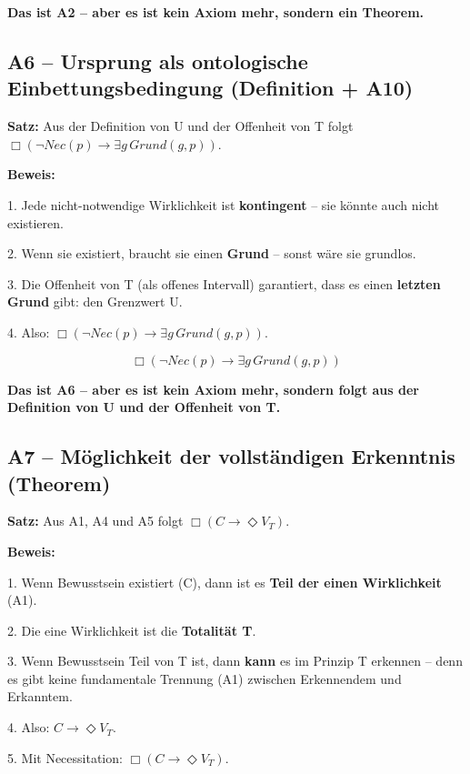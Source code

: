 \documentclass[
]{article}
\begin{document}
\textbf{Das ist A2 – aber es ist kein Axiom mehr, sondern ein Theorem.}

\subsection{A6 – Ursprung als ontologische Einbettungsbedingung (Definition + A10)}\label{a6-ursprung-als-ontologische-einbettungsbedingung-definition-a10}

\textbf{Satz:} Aus der Definition von U und der Offenheit von T folgt \(\Box(\neg Nec(p) \rightarrow \exists g\, Grund(g,p))\).

\textbf{Beweis:}

1. Jede nicht-notwendige Wirklichkeit ist \textbf{kontingent} – sie könnte auch nicht existieren.

2. Wenn sie existiert, braucht sie einen \textbf{Grund} – sonst wäre sie grundlos.

3. Die Offenheit von T (als offenes Intervall) garantiert, dass es einen \textbf{letzten Grund} gibt: den Grenzwert U.

4. Also: \(\Box(\neg Nec(p) \rightarrow \exists g\, Grund(g,p))\).

\[
\boxed{\Box(\neg Nec(p) \rightarrow \exists g\, Grund(g,p))}
\]

\textbf{Das ist A6 – aber es ist kein Axiom mehr, sondern folgt aus der Definition von U und der Offenheit von T.}

\subsection{A7 – Möglichkeit der vollständigen Erkenntnis (Theorem)}\label{a7-moumlglichkeit-der-vollstuxe4ndigen-erkenntnis-theorem}

\textbf{Satz:} Aus A1, A4 und A5 folgt \(\Box(C \rightarrow \Diamond V_T)\).

\textbf{Beweis:}

1. Wenn Bewusstsein existiert (C), dann ist es \textbf{Teil der einen Wirklichkeit} (A1).

2. Die eine Wirklichkeit ist die \textbf{Totalität T}.

3. Wenn Bewusstsein Teil von T ist, dann \textbf{kann} es im Prinzip T erkennen – denn es gibt keine fundamentale Trennung (A1) zwischen Erkennendem und Erkanntem.

4. Also: \(C \rightarrow \Diamond V_T\).

5. Mit Necessitation: \(\Box(C \rightarrow \Diamond V_T)\).
\end{document}
